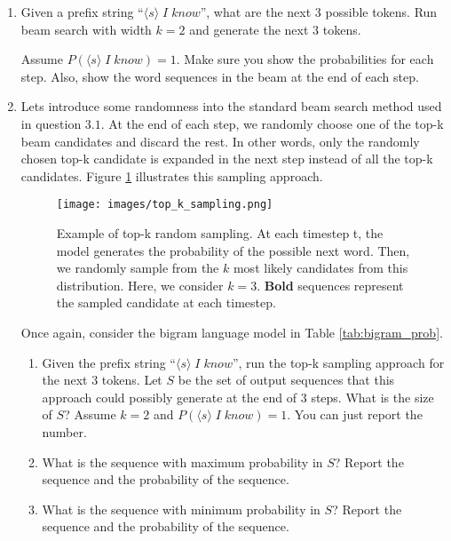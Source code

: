 \documentclass[11pt, letterpaper]{article}
\begin{document}
\begin{enumerate}
    \item Given a prefix string ``$\langle s\rangle\;I\;know$'', what are the next $3$ possible tokens. Run beam search with width $k=2$ and generate the next $3$ tokens. 
    
    Assume $P(\langle s  \rangle\;I\;know) = 1$. Make sure you show the probabilities for each step. Also, show the word sequences in the beam at the end of each step.
    
    \item Lets introduce some randomness into the standard beam search method used in question $3.1$. At the end of each step, we randomly choose one of the top-k beam candidates and discard the rest. In other words, only the randomly chosen top-k candidate is expanded in the next step instead of all the top-k candidates. Figure \ref{fig:top_k} illustrates this sampling approach.
    
    \begin{figure}[h!]
    \centering
    \texttt{[image: images/top\_k\_sampling.png]}
    \caption{Example of top-k random sampling. At each timestep t, the model generates the probability of the possible next word. Then, we randomly sample from the $k$ most likely candidates from this distribution. Here, we consider $k = 3$. \textbf{Bold} sequences represent the sampled candidate at each timestep.}
    \label{fig:top_k}
\end{figure}
    
    Once again, consider the bigram language model in Table \ref{tab:bigram_prob}.
    
    \begin{enumerate}
        \item Given the prefix string ``$\langle s\rangle\;I\;know$'', run the top-k sampling approach for the next 3 tokens.  Let $S$ be the set of output sequences that this approach could possibly generate at the end of 3 steps. What is the size of $S$? Assume $k = 2$ and $P(\langle s  \rangle\;I\;know) = 1$. You can just report the number.
        
        
        \item What is the sequence with maximum probability in $S$? Report the sequence and the probability of the sequence. 
        
        
        \item What is the sequence with  minimum probability in $S$? Report the sequence and the probability of the sequence.
        

\end{enumerate}
\end{enumerate}
\end{document}
